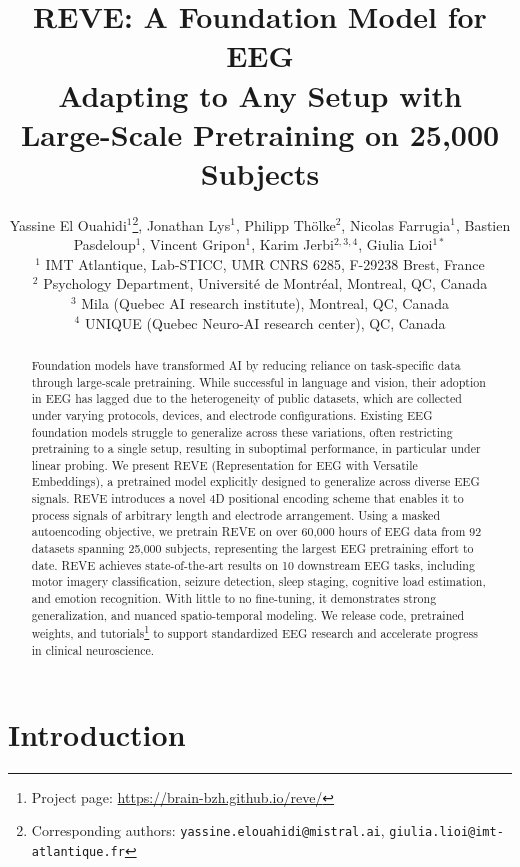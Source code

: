 \documentclass{article}
\title{REVE: A Foundation Model for EEG \\ Adapting to Any Setup with \\ Large-Scale Pretraining on 25,000 Subjects}
\author{
Yassine El Ouahidi$^{1}$\thanks{Corresponding authors: \texttt{yassine.elouahidi@mistral.ai}, \texttt{giulia.lioi@imt-atlantique.fr}},
Jonathan Lys$^{1}$,
Philipp Thölke$^{2}$,
Nicolas Farrugia$^{1}$,\break
Bastien Pasdeloup$^{1}$,
Vincent Gripon$^{1}$,
Karim Jerbi$^{2, 3, 4}$,
Giulia Lioi$^{1*}$\\
\small $^{1}$ IMT Atlantique, Lab-STICC, UMR CNRS 6285, F-29238 Brest, France\\
\small $^{2}$ Psychology Department, Université de Montréal, Montreal, QC, Canada\\
\small $^{3}$ Mila (Quebec AI research institute), Montreal, QC, Canada\\
\small $^{4}$ UNIQUE (Quebec Neuro-AI research center), QC, Canada
}
\begin{document}




\maketitle

\begin{abstract}
Foundation models have transformed AI by reducing reliance on task-specific data through large-scale pretraining. While successful in language and vision, their adoption in EEG has lagged due to the heterogeneity of public datasets, which are collected under varying protocols, devices, and electrode configurations. Existing EEG foundation models struggle to generalize across these variations, often restricting pretraining to a single setup, resulting in suboptimal performance, in particular under linear probing.
We present REVE (Representation for EEG with Versatile Embeddings), a pretrained model explicitly designed to generalize across diverse EEG signals. REVE introduces a novel 4D positional encoding scheme that enables it to process signals of arbitrary length and electrode arrangement. Using a masked autoencoding objective, we pretrain REVE on over 60,000 hours of EEG data from 92 datasets spanning 25,000 subjects, representing the largest EEG pretraining effort to date.
REVE achieves state-of-the-art results on 10 downstream EEG tasks, including motor imagery classification, seizure detection, sleep staging, cognitive load estimation, and emotion recognition. With little to no fine-tuning, it demonstrates strong generalization, and nuanced spatio-temporal modeling. We release code, pretrained weights, and tutorials\footnote{ Project page: \url{https://brain-bzh.github.io/reve/}} to support standardized EEG research and accelerate progress in clinical neuroscience.
\end{abstract}



\section{Introduction} %
\label{sec:introduction}
\end{document}
